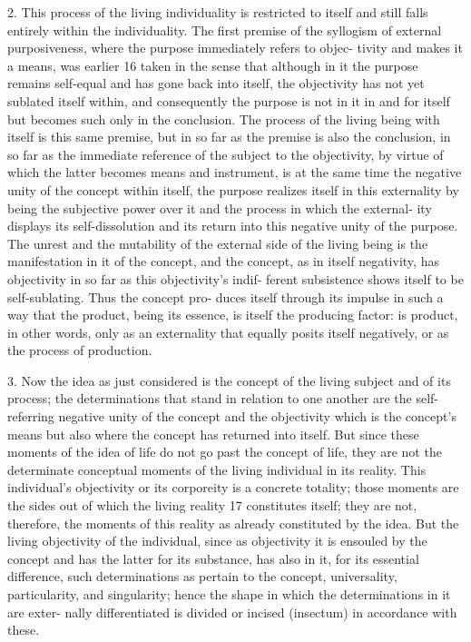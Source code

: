 2. This process of the living individuality is restricted to itself and still
falls entirely within the individuality.
 The first premise of the syllogism
of external purposiveness, where the purpose immediately refers to objec-
tivity and makes it a means, was earlier 16 taken in the sense that although
in it the purpose remains self-equal and has gone back into itself, the
objectivity has not yet sublated itself within, and consequently the purpose
is not in it in and for itself but becomes such only in the conclusion.
The process of the living being with itself is this same premise, but in
so far as the premise is also the conclusion, in so far as the immediate
reference of the subject to the objectivity, by virtue of which the latter
becomes means and instrument, is at the same time the negative unity of
the concept within itself, the purpose realizes itself in this externality by
being the subjective power over it and the process in which the external-
ity displays its self-dissolution and its return into this negative unity of
the purpose. The unrest and the mutability of the external side of the
living being is the manifestation in it of the concept, and the concept,
as in itself negativity, has objectivity in so far as this objectivity's indif-
ferent subsistence shows itself to be self-sublating. Thus the concept pro-
duces itself through its impulse in such a way that the product, being its
essence, is itself the producing factor: is product, in other words, only
as an externality that equally posits itself negatively, or as the process of
production.

3. Now the idea as just considered is the concept of the living subject and
of its process; the determinations that stand in relation to one another are
the self-referring negative unity of the concept and the objectivity which is
the concept's means but also where the concept has returned into itself.
But since these moments of the idea of life do not go past the concept
of life, they are not the determinate conceptual moments of the living
individual in its reality. This individual's objectivity or its corporeity is
a concrete totality; those moments are the sides out of which the living
reality 17 constitutes itself; they are not, therefore, the moments of this
reality as already constituted by the idea. But the living objectivity of the
individual, since as objectivity it is ensouled by the concept and has the
latter for its substance, has also in it, for its essential difference, such
determinations as pertain to the concept, universality, particularity, and
singularity; hence the shape in which the determinations in it are exter-
nally differentiated is divided or incised (insectum) in accordance with
these.

